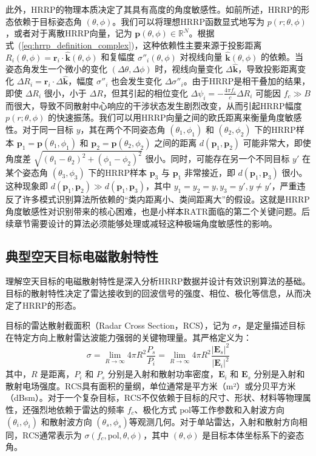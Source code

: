此外，HRRP的物理本质决定了其具有高度的角度敏感性。如前所述，HRRP的形态依赖于目标姿态角 $(\theta, \phi)$。我们可以将理想HRRP函数显式地写为 $p(r; \theta, \phi)$，或者对于离散HRRP向量，记为 $\mathbf{p}(\theta, \phi) \in \mathbb{R}^N$。根据式~(\ref{eq:hrrp_definition_complex})，这种依赖性主要来源于投影距离 $R_i(\theta, \phi) = \mathbf{r}_i \cdot \hat{\mathbf{k}}(\theta, \phi)$ 和复幅度 $\sigma''_i(\theta, \phi)$ 对视线向量 $\hat{\mathbf{k}}(\theta, \phi)$ 的依赖。当姿态角发生一个微小的变化 $(\Delta\theta, \Delta\phi)$ 时，视线向量变化 $\Delta\hat{\mathbf{k}}$，导致投影距离变化 $\Delta R_i = \mathbf{r}_i \cdot \Delta\hat{\mathbf{k}}$，幅度 $\sigma''_i$ 也会发生变化 $\Delta\sigma''_i$。由于HRRP是相干叠加的结果，即使 $\Delta R_i$ 很小，小于 $\Delta R$，但其引起的相位变化 $\Delta\psi_i = - \frac{4\pi f_c}{c} \Delta R_i$ 可能因 $f_c \gg B$而很大，导致不同散射中心响应的干涉状态发生剧烈改变，从而引起HRRP幅度 $p(r; \theta, \phi)$ 的快速振荡。我们可以用HRRP向量之间的欧氏距离来衡量角度敏感性。对于同一目标 $y$，其在两个不同姿态角 $(\theta_1, \phi_1)$ 和 $(\theta_2, \phi_2)$ 下的HRRP样本 $\mathbf{p}_1 = \mathbf{p}(\theta_1, \phi_1)$ 和 $\mathbf{p}_2 = \mathbf{p}(\theta_2, \phi_2)$ 之间的距离 $d(\mathbf{p}_1, \mathbf{p}_2)$ 可能非常大，即使角度差 $\sqrt{(\theta_1-\theta_2)^2 + (\phi_1-\phi_2)^2}$ 很小。同时，可能存在另一个不同目标 $y'$ 在某个姿态角 $(\theta_3, \phi_3)$ 下的HRRP样本 $\mathbf{p}_3$ 与 $\mathbf{p}_1$ 非常接近，即 $d(\mathbf{p}_1, \mathbf{p}_3)$ 很小。这种现象即 $d(\mathbf{p}_1, \mathbf{p}_2) \gg d(\mathbf{p}_1, \mathbf{p}_3)$，其中 $y_1=y_2=y, y_3=y', y \neq y'$，严重违反了许多模式识别算法所依赖的“类内距离小、类间距离大”的假设。这就是HRRP角度敏感性对识别带来的核心困难，也是小样本RATR面临的第二个关键问题。后续章节需要设计的算法必须能够处理或减轻这种极端角度敏感性的影响。

\subsection{典型空天目标电磁散射特性}
\label{subsec:scattering_characteristics}

理解空天目标的电磁散射特性是深入分析HRRP数据并设计有效识别算法的基础。目标的散射特性决定了雷达接收到的回波信号的强度、相位、极化等信息，从而决定了HRRP的形态。

目标的雷达散射截面积（Radar Cross Section，RCS），记为 $\sigma$，是定量描述目标在特定方向上散射雷达波能力强弱的关键物理量。其严格定义为：
\begin{equation}
    \sigma = \lim_{R \to \infty} 4\pi R^2 \frac{P_s}{P_i} = \lim_{R \to \infty} 4\pi R^2 \frac{|\mathbf{E}_s|^2}{|\mathbf{E}_i|^2}
    \label{eq:rcs_definition}
\end{equation}
其中，$R$ 是距离，$P_i$ 和 $P_s$ 分别是入射和散射功率密度，$\mathbf{E}_i$ 和 $\mathbf{E}_s$ 分别是入射和散射电场强度。RCS具有面积的量纲，单位通常是平方米（m²）或分贝平方米（dBsm）。对于一个复杂目标，RCS不仅依赖于目标的尺寸、形状、材料等物理属性，还强烈地依赖于雷达的频率 $f_c$、极化方式 $\text{pol}$等工作参数和入射波方向 $(\theta_i, \phi_i)$ 和散射波方向 $(\theta_s, \phi_s)$等观测几何。对于单站雷达，入射和散射方向相同，RCS通常表示为 $\sigma(f_c, \text{pol}, \theta, \phi)$，其中 $(\theta, \phi)$ 是目标本体坐标系下的姿态角。

